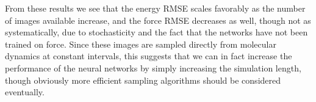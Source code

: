 From these results we see that the energy RMSE scales favorably as
the number of images available increase, and the force RMSE decreases
as well, though not as systematically, due to stochasticity and
the fact that the networks have not been trained on force.
Since these images are sampled directly from molecular dynamics
at constant intervals, this suggests that we can in fact increase
the performance of the neural networks by simply increasing the simulation
length, though obviously more efficient sampling algorithms
should be considered eventually.
